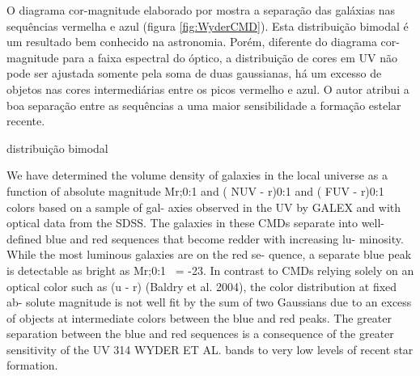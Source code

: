O diagrama cor-magnitude elaborado por \cite{Wyder2007} mostra a separação das
galáxias nas sequências vermelha e azul (figura \ref{fig:WyderCMD}). Esta
distribuição bimodal é um resultado bem conhecido na astronomia. Porém,
diferente do diagrama cor-magnitude para a faixa espectral do óptico, a
distribuição de cores em UV não pode ser ajustada somente pela soma de duas
gaussianas, há um excesso de objetos nas cores intermediárias entre os picos
vermelho e azul. O autor atribui a boa separação entre as sequências a uma maior
sensibilidade a formação estelar recente.

distribuição bimodal 


We have determined the volume density of galaxies
in the local universe as a function of absolute magnitude Mr;0:1 and ( NUV -
r)0:1 and ( FUV - r)0:1 colors based on a sample of gal- axies observed in the
UV by GALEX and with optical data from the SDSS. The galaxies in these CMDs
separate into well-defined blue and red sequences that become redder with
increasing lu- minosity. While the most luminous galaxies are on the red se-
quence, a separate blue peak is detectable as bright as Mr;0:1 ~= -23. In
contrast to CMDs relying solely on an optical color such as (u - r) (Baldry et
al. 2004), the color distribution at fixed ab- solute magnitude is not well fit
by the sum of two Gaussians due to an excess of objects at intermediate colors
between the blue and red peaks. The greater separation between the blue and red
sequences is a consequence of the greater sensitivity of the UV 314 WYDER ET AL.
bands to very low levels of recent star formation. 

